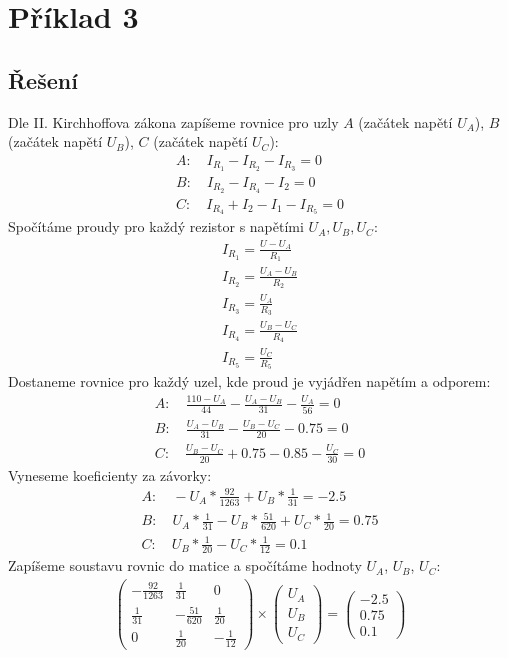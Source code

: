 \section{Příklad 3}
\makebox[\linewidth]{\rule{\textwidth}{0.5pt}}
\subsection{Řešení}
Dle II. Kirchhoffova zákona zapíšeme rovnice pro uzly $A$ (začátek napětí $U_A$), $B$ (začátek napětí $U_B$), $C$ (začátek napětí $U_C$):
\begin{gather*}
A: \quad I_{R_1} - I_{R_2} - I_{R_3} = 0\\
B: \quad I_{R_2} - I_{R_4} - I_2 = 0\\
C: \quad I_{R_4} + I_2 - I_1 - I_{R_5} = 0
\end{gather*}
Spočítáme proudy pro každý rezistor s napětími $U_A, U_B, U_C$:
\begin{gather*}
I_{R_1} = \frac{U-U_{A}}{R_{1}} \\
I_{R_2} = \frac{U_{A}-U_{B}}{R_{2}} \\
I_{R_3} = \frac{U_{A}}{R_{3}} \\
I_{R_4} = \frac{U_{B}-U_{C}}{R_{4}}\\
I_{R_5} = \frac{U_{C}}{R_{5}}
\end{gather*}
Dostaneme rovnice pro každý uzel, kde proud je vyjádřen napětím a odporem:
\begin{gather*}
A: \quad \frac{110-U_{A}}{44} - \frac{U_{A}-U_{B}}{31} - \frac{U_{A}}{56} = 0 \\
B: \quad \frac{U_{A}-U_{B}}{31} - \frac{U_{B}-U_{C}}{20} - 0.75 = 0 \\
C: \quad \frac{U_{B}-U_{C}}{20} + 0.75 - 0.85 - \frac{U_{C}}{30} = 0
\end{gather*}
Vyneseme koeficienty za závorky:
\begin{gather*}
A: \quad -U_A * \frac{92}{1263} + U_B * \frac{1}{31} = -2.5 \\
B: \quad U_A * \frac{1}{31} - U_B * \frac{51}{620} + U_C * \frac{1}{20} = 0.75\\
C: \quad U_B * \frac{1}{20} - U_C * \frac{1}{12} = 0.1
\end{gather*}
Zapíšeme soustavu rovnic do matice a spočítáme hodnoty $U_A$, $U_B$, $U_C$:
\begin{gather*}
\begin{pmatrix}
-\frac{92}{1263} & \frac{1}{31} & 0\\
\frac{1}{31} & -\frac{51}{620} & \frac{1}{20}\\
0 & \frac{1}{20} & -\frac{1}{12}
\end{pmatrix}
\times
\begin{pmatrix}
U_A\\
U_B\\
U_C
\end{pmatrix}
=
\begin{pmatrix}
-2.5\\
0.75\\
0.1
\end{pmatrix}
\end{gather*}
